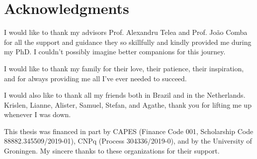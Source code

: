 \manualmark
{} %

\begingroup
\let\clearpage\relax
\let\cleardoublepage\relax
\let\cleardoublepage\relax

\chapter*{Acknowledgments}

I would like to thank my advisors Prof. Alexandru Telea and Prof. Jo\~{a}o Comba for all the support and guidance they so skillfully and kindly provided me during my PhD. I couldn't possibly imagine better companions for this journey.

I would like to thank my family for their love, their patience, their inspiration, and for always providing me all I've ever needed to succeed.

I would also like to thank all my friends both in Brazil and in the Netherlands. Krislen, Lianne, Alister, Samuel, Stefan, and Agathe, thank you for lifting me up whenever I was down.


\bigbreak

This thesis was financed in part by CAPES (Finance Code 001, Scholarship Code 88882.345509/2019-01), CNPq (Process 304336/2019-0), and by the University of Groningen. 
My sincere thanks to these organizations for their support.

\endgroup



